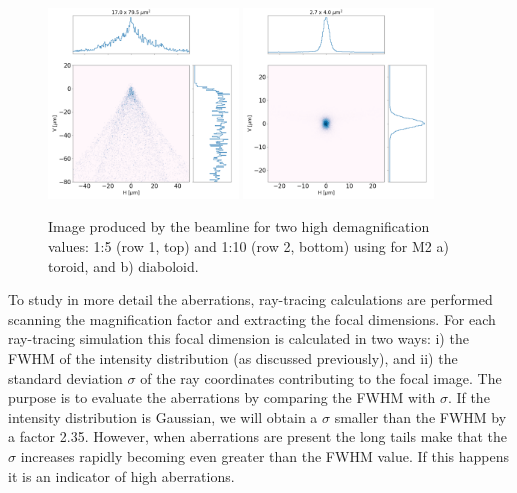 \documentclass{iucr}              %
\begin{document}
\begin{figure}
\includegraphics[width=0.45\textwidth]{figures/M0p1_toroid.png}
\includegraphics[width=0.45\textwidth]{figures/M0p1_diaboloid.png}
\caption{
Image produced by the beamline for two high demagnification values: 1:5 (row 1, top) and 1:10 (row 2, bottom) using for M2 a) toroid, and b) diaboloid.}
\end{figure}


To study in more detail the aberrations, ray-tracing calculations are performed scanning the magnification factor and extracting the focal dimensions. For each ray-tracing simulation this focal dimension is calculated in two ways: i) the FWHM of the intensity distribution (as discussed previously), and ii) the standard deviation $\sigma$ of the ray coordinates contributing to the focal image. The purpose is to evaluate the aberrations by comparing the FWHM with $\sigma$. If the intensity distribution is Gaussian, we will obtain a $\sigma$ smaller than the FWHM by a factor 2.35. However, when aberrations are present the long tails make that the $\sigma$ increases rapidly becoming even greater than the FWHM value. If this happens it is an indicator of high aberrations.  
\end{document}
